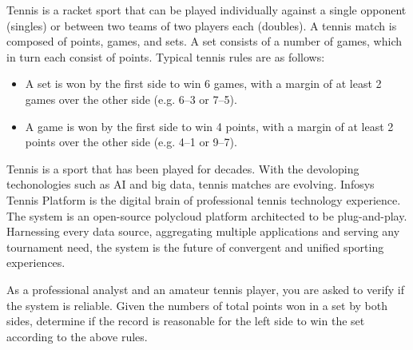 Tennis is a racket sport that can be played individually against a single opponent (singles)
or between two teams of two players each (doubles).
A tennis match is composed of points, games, and sets.
A set consists of a number of games, which in turn each consist of points.
Typical tennis rules are as follows:
\begin{itemize}
	\item A set is won by the first side to win 6 games,
		with a margin of at least 2 games over the other side (e.g. 6–3 or 7–5).
	\item A game is won by the first side to win 4 points,
		with a margin of at least 2 points over the other side (e.g. 4–1 or 9–7).
\end{itemize}

Tennis is a sport that has been played for decades.
With the devoloping techonologies such as AI and big data, tennis matches are evolving.
Infosys Tennis Platform is the digital brain of professional tennis technology experience.
The system is an open-source polycloud platform architected to be plug-and-play.
Harnessing every data source, aggregating multiple applications and serving any tournament need,
the system is the future of convergent and unified sporting experiences.

As a professional analyst and an amateur tennis player,
you are asked to verify if the system is reliable.
Given the numbers of total points won in a set by both sides,
determine if the record is reasonable for the left side to win the set according to the above rules.

